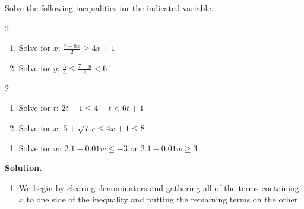 \documentclass{ximera}
\begin{document}
\begin{example}\label{linearineqreview}  Solve the following inequalities for the indicated variable. 

\begin{multicols}{2}

\begin{enumerate}

\item  Solve for $x$: $ \frac{7-8x}{2} \geq 4x + 1$

\item  Solve for $y$: $ \frac{3}{4} \leq  \frac{7-y}{2} < 6$

\setcounter{HW}{\value{enumi}}

\end{enumerate}

\end{multicols}

\begin{multicols}{2}

\begin{enumerate}

\setcounter{enumi}{\value{HW}}

\item  Solve for $t$:  $2t-1 \leq 4-t < 6t+1$

\item  Solve for $x$: $5 + \sqrt{7} x \leq 4x + 1 \leq 8$


\setcounter{HW}{\value{enumi}}

\end{enumerate}

\end{multicols}

\begin{enumerate}
\setcounter{enumi}{\value{HW}}

\item  Solve for $w$: $2.1 - 0.01w \leq -3$ or $2.1-0.01w \geq 3$


\end{enumerate}

{\bf Solution.}

\begin{enumerate}

\item  We begin by clearing denominators and gathering all of the terms containing $x$ to one side of the inequality and putting the remaining terms on the other.\[ \begin{array}{rclr}


\end{array}\]
\end{enumerate}
\end{example}
\end{document}
